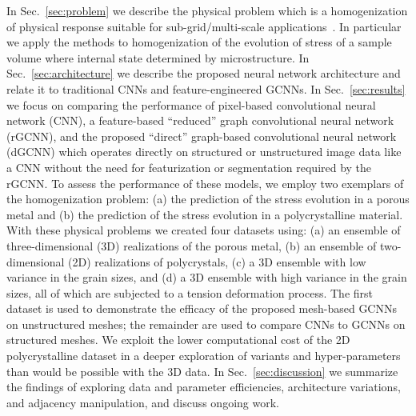 \documentclass[12pt,reqno]{article}
\newcommand{\ADD}[1]{{#1}}
\newcommand{\sref}[1]{Sec.\!~\ref{#1}}
\newcommand{\DGCNN}{{dGCNN}}
\newcommand{\RGCNN}{{rGCNN}}
\begin{document}
In \sref{sec:problem} we describe the physical problem which is a homogenization of physical response suitable for sub-grid/multi-scale applications~\cite{jones2018machine,frankel2019oligocrystals}.
In particular we apply the methods to homogenization of the evolution of stress of a sample volume where internal state determined by microstructure.
In \sref{sec:architecture} we describe the proposed neural network architecture and relate it to traditional CNNs and feature-engineered GCNNs.
In \sref{sec:results} we focus on comparing the performance of pixel-based convolutional neural network (CNN), a feature-based ``reduced'' graph convolutional neural network (\RGCNN), and the proposed ``direct'' graph-based convolutional neural network (\DGCNN) \ADD{which operates directly on structured or unstructured image data like a CNN without the need for featurization or segmentation required by the \RGCNN}.
\ADD{
To assess the performance of these models, we employ two exemplars of the homogenization problem: (a) the prediction of the stress evolution in a porous metal and (b) the prediction of the stress evolution in a polycrystalline material.
With these physical problems we created four datasets using: (a) an ensemble of three-dimensional (3D) realizations of the porous metal,  (b) an ensemble of two-dimensional (2D) realizations of polycrystals, (c) a 3D ensemble with low variance in the grain sizes, and (d) a 3D ensemble with high variance in the grain sizes, all of which are subjected to a tension deformation process.
The first dataset is used to demonstrate the efficacy of the proposed mesh-based GCNNs on unstructured meshes; the remainder are used to compare CNNs to GCNNs on structured meshes.
We exploit the lower computational cost of the 2D polycrystalline dataset in a deeper exploration of variants and hyper-parameters than would be possible with the 3D data.
}
In \sref{sec:discussion} we summarize the findings of exploring data and parameter efficiencies, architecture variations, and adjacency manipulation, and discuss ongoing work.
\end{document}
